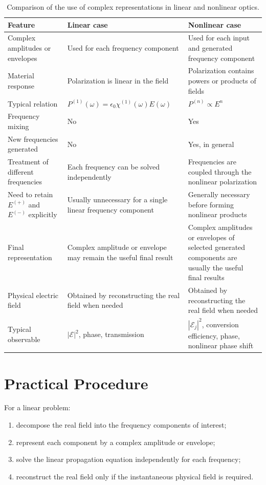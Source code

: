\documentclass[11pt]{article}
\begin{document}
\begin{table}[ht]
\centering
\renewcommand{\arraystretch}{1.35}
\begin{tabular}{p{} p{} p{}}
\hline
\textbf{Feature} & \textbf{Linear case} & \textbf{Nonlinear case} \\
\hline
Complex amplitudes or envelopes & Used for each frequency component & Used for each input and generated frequency component \\
\hline
Material response & Polarization is linear in the field & Polarization contains powers or products of fields \\
\hline
Typical relation & \(P^{(1)}(\omega)=\epsilon_0\chi^{(1)}(\omega)E(\omega)\) & \(P^{(n)}\propto E^n\) \\
\hline
Frequency mixing & No & Yes \\
\hline
New frequencies generated & No & Yes, in general \\
\hline
Treatment of different frequencies & Each frequency can be solved independently & Frequencies are coupled through the nonlinear polarization \\
\hline
Need to retain \(E^{(+)}\) and \(E^{(-)}\) explicitly & Usually unnecessary for a single linear frequency component & Generally necessary before forming nonlinear products \\
\hline
Final representation & Complex amplitude or envelope may remain the useful final result & Complex amplitudes or envelopes of selected generated components are usually the useful final results \\
\hline
Physical electric field & Obtained by reconstructing the real field when needed & Obtained by reconstructing the real field when needed \\
\hline
Typical observable & \( |\mathcal{E}|^2 \), phase, transmission & \( |\mathcal{E}_j|^2 \), conversion efficiency, phase, nonlinear phase shift \\
\hline
\end{tabular}
\caption{Comparison of the use of complex representations in linear and nonlinear optics.}
\end{table}

\section{Practical Procedure}

For a linear problem:

\begin{enumerate}
    \item decompose the real field into the frequency components of interest;
    \item represent each component by a complex amplitude or envelope;
    \item solve the linear propagation equation independently for each frequency;
    \item reconstruct the real field only if the instantaneous physical field is required.
\end{enumerate}
\end{document}

